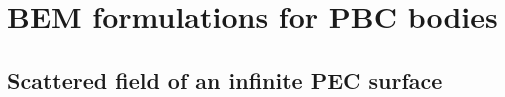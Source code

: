 \newcommand{\GammaBar}{\overline{\BG}}
\newcommand{\GBar}{\overline{G}}
\newcommand{\CBar}{\overline{C}}
\newcommand{\VBGBar}{\overline{\vb G}}
\newcommand{\VBCBar}{\overline{\vb C}}
\newcommand{\KB}{\vb k\subt{B}}

\section{BEM formulations for PBC bodies}

\subsection{Scattered field of an infinite PEC surface}

